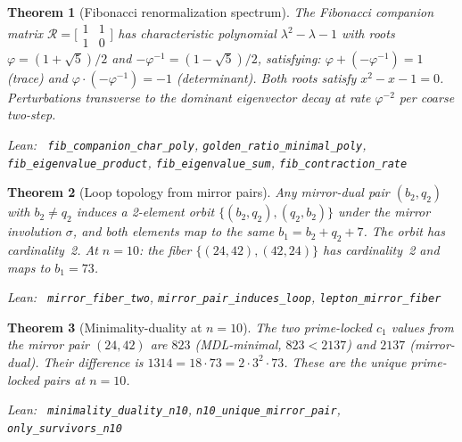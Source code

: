 \documentclass[11pt,a4paper]{article}
\newenvironment{leanref}%
  {\par\smallskip\noindent\begingroup\raggedright\textup{Lean:}~}%
  {\par\endgroup}
\newtheorem{theorem}{Theorem}[section]
\theoremstyle{definition}
\begin{document}
\begin{theorem}[Fibonacci renormalization spectrum]\label{thm:fib-spectrum}
The Fibonacci companion matrix $\mathcal{R} = \bigl[\begin{smallmatrix}1&1\\1&0\end{smallmatrix}\bigr]$
has characteristic polynomial $\lambda^2 - \lambda - 1$ with roots
$\varphi = (1+\sqrt{5})/2$ and $-\varphi^{-1} = (1-\sqrt{5})/2$, satisfying:
$\varphi + (-\varphi^{-1}) = 1$ (trace) and $\varphi \cdot (-\varphi^{-1}) = -1$ (determinant).
Both roots satisfy $x^2 - x - 1 = 0$.  Perturbations transverse to the dominant
eigenvector decay at rate $\varphi^{-2}$ per coarse two-step.

\begin{leanref} \lstinline|fib_companion_char_poly|,
\lstinline|golden_ratio_minimal_poly|,
\lstinline|fib_eigenvalue_product|,
\lstinline|fib_eigenvalue_sum|,
\lstinline|fib_contraction_rate|
\end{leanref}
\end{theorem}

\begin{theorem}[Loop topology from mirror pairs]\label{thm:loop}
Any mirror-dual pair $(b_2, q_2)$ with $b_2 \ne q_2$ induces a 2-element orbit
$\{(b_2,q_2), (q_2,b_2)\}$ under the mirror involution $\sigma$, and both elements
map to the same $b_1 = b_2 + q_2 + 7$.  The orbit has cardinality~2.
At $n=10$: the fiber $\{(24,42),(42,24)\}$ has cardinality~2 and maps to $b_1 = 73$.

\begin{leanref} \lstinline|mirror_fiber_two|, \lstinline|mirror_pair_induces_loop|,
\lstinline|lepton_mirror_fiber|
\end{leanref}
\end{theorem}

\begin{theorem}[Minimality-duality at $n=10$]\label{thm:min-dual}
The two prime-locked $c_1$ values from the mirror pair $(24,42)$ are
$823$ (MDL-minimal, $823 < 2137$) and $2137$ (mirror-dual).
Their difference is $1314 = 18 \cdot 73 = 2 \cdot 3^2 \cdot 73$.
These are the unique prime-locked pairs at $n=10$.

\begin{leanref} \lstinline|minimality_duality_n10|, \lstinline|n10_unique_mirror_pair|,
\lstinline|only_survivors_n10|
\end{leanref}
\end{theorem}
\end{document}
